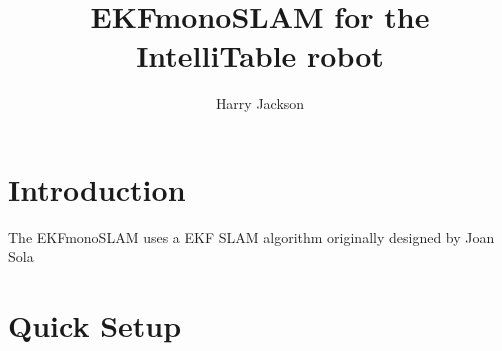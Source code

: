 \documentclass[11pt]{amsart}
\title{EKFmonoSLAM for the IntelliTable robot}
\author{Harry Jackson}
\begin{document}
\maketitle
\section{Introduction}
The EKFmonoSLAM uses a EKF SLAM algorithm originally designed by Joan Sola ~\cite{sola2012impact}
\section{Quick Setup}




{}

\end{document}
